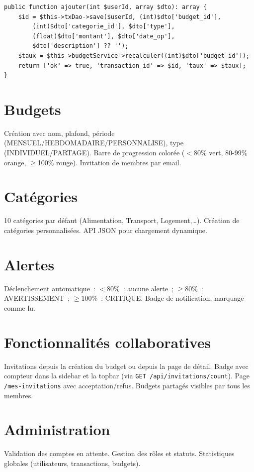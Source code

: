 \documentclass[12pt,a4paper,twoside]{report}
\begin{document}
\begin{lstlisting}[style=phpstyle, caption=Ajout de transaction]
public function ajouter(int $userId, array $dto): array {
    $id = $this->txDao->save($userId, (int)$dto['budget_id'],
        (int)$dto['categorie_id'], $dto['type'],
        (float)$dto['montant'], $dto['date_op'],
        $dto['description'] ?? '');
    $taux = $this->budgetService->recalculer((int)$dto['budget_id']);
    return ['ok' => true, 'transaction_id' => $id, 'taux' => $taux];
}
\end{lstlisting}

\section{Budgets}
Création avec nom, plafond, période (MENSUEL/HEBDOMADAIRE/PERSONNALISE), type (INDIVIDUEL/PARTAGE). Barre de progression colorée ($<$80\% vert, 80-99\% orange, $\ge$100\% rouge). Invitation de membres par email.

\section{Catégories}
10 catégories par défaut (Alimentation, Transport, Logement,\ldots). Création de catégories personnalisées. API JSON pour chargement dynamique.

\section{Alertes}
Déclenchement automatique~: $<$80\%~: aucune alerte~; $\ge$80\%~: AVERTISSEMENT~; $\ge$100\%~: CRITIQUE. Badge de notification, marquage comme lu.

\section{Fonctionnalités collaboratives}
Invitations depuis la création du budget ou depuis la page de détail. Badge avec compteur dans la sidebar et la topbar (via \texttt{GET /api/invitations/count}). Page \texttt{/mes-invitations} avec acceptation/refus. Budgets partagés visibles par tous les membres.

\section{Administration}
Validation des comptes en attente. Gestion des rôles et statuts. Statistiques globales (utilisateurs, transactions, budgets).
\end{document}
